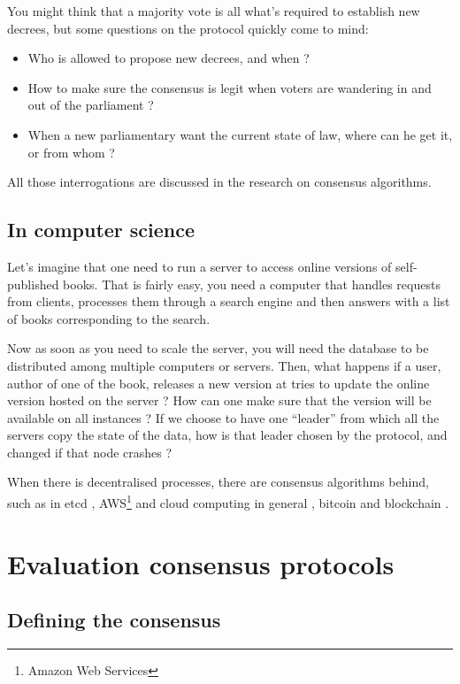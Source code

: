 \documentclass[11pt, twocolumn]{article}
\begin{document}
You might think that a majority vote is all what's required to establish new decrees, but some questions on the protocol quickly come to mind:
\begin{itemize}
    \item Who is allowed to propose new decrees, and when ?
    \item How to make sure the consensus is legit when voters are wandering in and out of the parliament ?
    \item When a new parliamentary want the current state of law, where can he get it, or from whom ?
\end{itemize}

All those interrogations are discussed in the research on consensus algorithms.

\subsection{In computer science}

Let’s imagine that one need to run a server to access online versions of self-published books. That is fairly easy, you need a computer that handles requests from clients, processes them through a search engine and then answers with a list of books corresponding to the search.

Now as soon as you need to scale the server, you will need the database to be distributed among multiple computers or servers.
Then, what happens if a user, author of one of the book, releases a new version at tries to update the online version hosted on the server ?
How can one make sure that the version will be available on all instances ? If we choose to have one “leader” from which all the servers copy the state of the data, how is that leader chosen by the protocol, and changed if that node crashes ?

When there is decentralised processes, there are consensus algorithms behind, such as in etcd \cite{etcd}, AWS\footnote{Amazon Web Services} and cloud computing in general \cite{aws}, bitcoin and blockchain \cite{bitcoin}.



\section{Evaluation consensus protocols}
\subsection{Defining the consensus}
\end{document}
